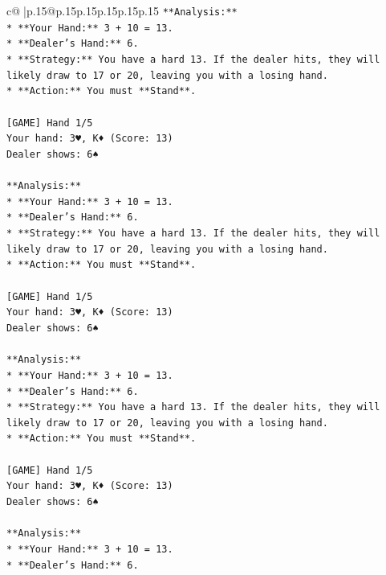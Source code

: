 \documentclass{article}
\begin{document}
{\begin{supertabular}{c@{$\;$}|p{.15\linewidth}@{}p{.15\linewidth}p{.15\linewidth}p{.15\linewidth}p{.15\linewidth}p{.15\linewidth}}
{{{\texttt{**Analysis:**} \\
\texttt{*   **Your Hand:** 3 + 10 = 13.} \\
\texttt{*   **Dealer's Hand:** 6.} \\
\texttt{*   **Strategy:** You have a hard 13. If the dealer hits, they will likely draw to 17 or 20, leaving you with a losing hand.} \\
\texttt{*   **Action:** You must **Stand**.} \\
\\ 
\texttt{{[}GAME{]} Hand 1/5} \\
\texttt{Your hand: 3♥, K♦ (Score: 13)} \\
\texttt{Dealer shows: 6♠} \\
\\ 
\texttt{**Analysis:**} \\
\texttt{*   **Your Hand:** 3 + 10 = 13.} \\
\texttt{*   **Dealer's Hand:** 6.} \\
\texttt{*   **Strategy:** You have a hard 13. If the dealer hits, they will likely draw to 17 or 20, leaving you with a losing hand.} \\
\texttt{*   **Action:** You must **Stand**.} \\
\\ 
\texttt{{[}GAME{]} Hand 1/5} \\
\texttt{Your hand: 3♥, K♦ (Score: 13)} \\
\texttt{Dealer shows: 6♠} \\
\\ 
\texttt{**Analysis:**} \\
\texttt{*   **Your Hand:** 3 + 10 = 13.} \\
\texttt{*   **Dealer's Hand:** 6.} \\
\texttt{*   **Strategy:** You have a hard 13. If the dealer hits, they will likely draw to 17 or 20, leaving you with a losing hand.} \\
\texttt{*   **Action:** You must **Stand**.} \\
\\ 
\texttt{{[}GAME{]} Hand 1/5} \\
\texttt{Your hand: 3♥, K♦ (Score: 13)} \\
\texttt{Dealer shows: 6♠} \\
\\ 
\texttt{**Analysis:**} \\
\texttt{*   **Your Hand:** 3 + 10 = 13.} \\
\texttt{*   **Dealer's Hand:** 6.} \\
}}}
\end{supertabular}}
\end{document}
